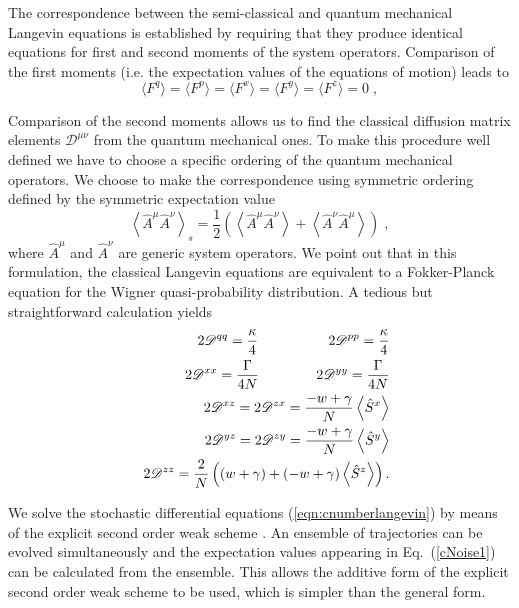 \documentclass[aps,
twocolumn,
showpacs,
superscriptaddress,groupedaddress]{revtex4}
\begin{document}
The correspondence between the semi-classical and quantum mechanical
Langevin equations is established by requiring that they produce
identical equations for first and second moments of the system
operators.  Comparison of the first moments (i.e. the expectation
values of the equations of motion) leads to
\begin{equation}
\langle F^q\rangle = 
\langle F^p\rangle = 
\langle F^x\rangle = 
\langle F^y\rangle = 
\langle F^z\rangle = 0\;,
\end{equation}

Comparison of the second moments allows us to find the classical
diffusion matrix elements $\mathscr{D}^{\mu \nu}$ from the quantum
mechanical ones.  To make this procedure well defined we have to choose
a specific ordering of the quantum mechanical operators.  We choose to
make the correspondence using symmetric ordering defined by the
symmetric expectation value
\begin{equation}
\left< \hat{A}^{\mu} \hat{A}^{\nu} \right>_s=
\frac{1}{2} \left( \left< \hat{A}^{\mu} \hat{A}^{\nu} \right> + \left<
\hat{A}^{\nu} \hat{A}^{\mu} \right> \right)\;,
\end{equation}
where $\hat{A}^{\mu}$ and $\hat{A}^{\nu}$ are generic system operators.
We point out that in this formulation, the classical Langevin equations
are equivalent to a Fokker-Planck equation for the Wigner
quasi-probability distribution.  A tedious but straightforward
calculation yields
\begin{eqnarray}
&& 2\mathscr{D}^{q q}=
\frac{\kappa}{4} \hspace{0.7in} 2\mathscr{D}^{p p}=
\frac{\kappa}{4} \nonumber \\
&& 2\mathscr{D}^{xx}=
\frac{\Gamma}{4N} \hspace{0.57in} 2\mathscr{D}^{yy}=
\frac{\Gamma}{4N} \nonumber \\
&& 2\mathscr{D}^{xz}=
2\mathscr{D}^{zx}=
\frac{-w+\gamma}{N} \left< \hat{S}^{x} \right>  \nonumber \\
&& 2\mathscr{D}^{yz}=
2\mathscr{D}^{zy}=
\frac{-w+\gamma}{N} \left< \hat{S}^{y} \right>  \nonumber \\
&& 2\mathscr{D}^{zz}=
\frac{2}{N}\left((w+\gamma) + (-w+\gamma)  \left< \hat{S}^{z} \right> \right).
\label{cNoise1}
\end{eqnarray}

We solve the stochastic differential equations
(\ref{eqn:cnumberlangevin}) by means of the explicit second order weak scheme \cite{kloeden2011numerical}. An ensemble of trajectories can be evolved simultaneously and the expectation values appearing in Eq.~(\ref{cNoise1}) can be calculated from the ensemble. This allows the additive form of the explicit second order weak scheme to be used, which is simpler than the general form.
\end{document}
